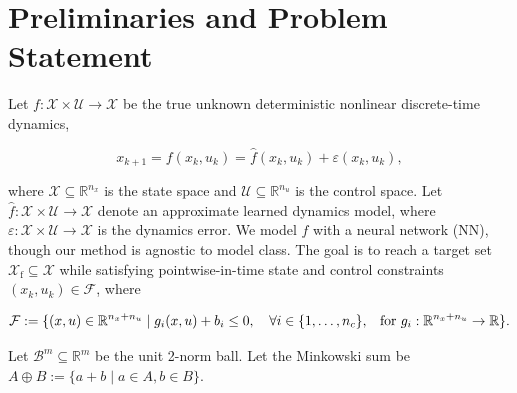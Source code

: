 \documentclass{l4dc2026}
\begin{document}
\vspace{-10pt}
\section{Preliminaries and Problem Statement}\label{sec:preliminaries}
\vspace{-4pt}

Let $f: \mathcal{X} \times \mathcal{U} \rightarrow \mathcal{X}$ be the true unknown deterministic nonlinear discrete-time dynamics,

\vspace{-9pt}
\begin{equation}\label{eq:dynamics}
    x_{k+1} = f(x_k, u_k) = \hat f(x_k, u_k) + \varepsilon(x_k, u_k),
\end{equation}
\vspace{-13pt}

\noindent where $\mathcal{X} \subseteq \mathbb{R}^{n_x}$ is the state space and $\mathcal{U} \subseteq \mathbb{R}^{n_u}$ is the control
space. Let $\hat f: \mathcal{X} \times \mathcal{U} \rightarrow \mathcal{X}$ denote an approximate learned dynamics model, where $\varepsilon: \mathcal{X} \times \mathcal{U} \rightarrow \mathcal{X}$ is the dynamics error. We model $\hat f$ with a neural network (NN), though our method is agnostic to model class. The goal is to reach a target set $\mathcal{X}_\textrm{f} \subseteq \mathcal{X}$ while satisfying pointwise-in-time state and control constraints $(x_k, u_k) \in \mathcal{F}$, where

\vspace{-18pt}
\begin{equation}\label{eq:constraints}
    \mathcal{F} := \{(x, u) \in \mathbb{R}^{n_x + n_u} \mid g_i(x,u) + b_i \le 0,\quad \forall i\in\{1,\ldots,n_c\}\text{,\quad for }g_i:\mathbb{R}^{n_x + n_u} \to \mathbb{R}\}.
\end{equation}
\vspace{-16pt}

\noindent Let $\mathcal{B}^m \subseteq \mathbb{R}^m $ be the unit 2-norm ball. Let the Minkowski sum be $A \oplus B := \{a + b\mid a \in A, b \in B\}$.%
\end{document}
